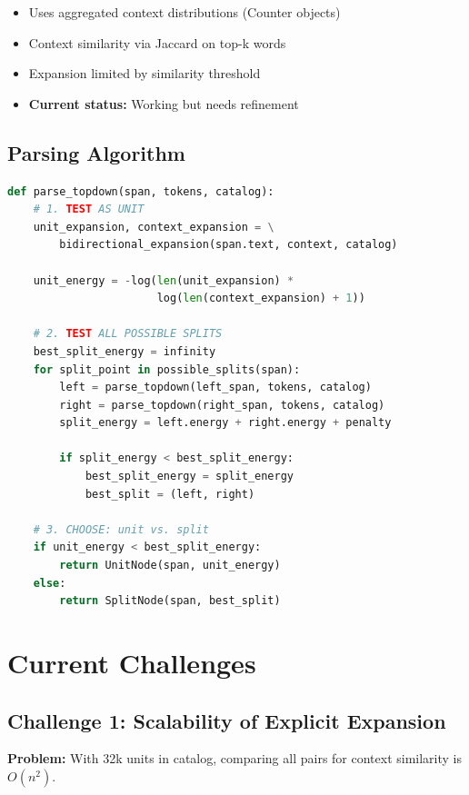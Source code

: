 \documentclass[11pt]{article}
\begin{document}
\begin{itemize}
\item Uses aggregated context distributions (Counter objects)
\item Context similarity via Jaccard on top-k words
\item Expansion limited by similarity threshold
\item \textbf{Current status:} Working but needs refinement
\end{itemize}

\subsection{Parsing Algorithm}

\begin{lstlisting}[language=Python, basicstyle=\small\ttfamily]
def parse_topdown(span, tokens, catalog):
    # 1. TEST AS UNIT
    unit_expansion, context_expansion = \
        bidirectional_expansion(span.text, context, catalog)

    unit_energy = -log(len(unit_expansion) *
                       log(len(context_expansion) + 1))

    # 2. TEST ALL POSSIBLE SPLITS
    best_split_energy = infinity
    for split_point in possible_splits(span):
        left = parse_topdown(left_span, tokens, catalog)
        right = parse_topdown(right_span, tokens, catalog)
        split_energy = left.energy + right.energy + penalty

        if split_energy < best_split_energy:
            best_split_energy = split_energy
            best_split = (left, right)

    # 3. CHOOSE: unit vs. split
    if unit_energy < best_split_energy:
        return UnitNode(span, unit_energy)
    else:
        return SplitNode(span, best_split)
\end{lstlisting}

\section{Current Challenges}

\subsection{Challenge 1: Scalability of Explicit Expansion}

\textbf{Problem:} With 32k units in catalog, comparing all pairs for context similarity is $O(n^2)$.
\end{document}
